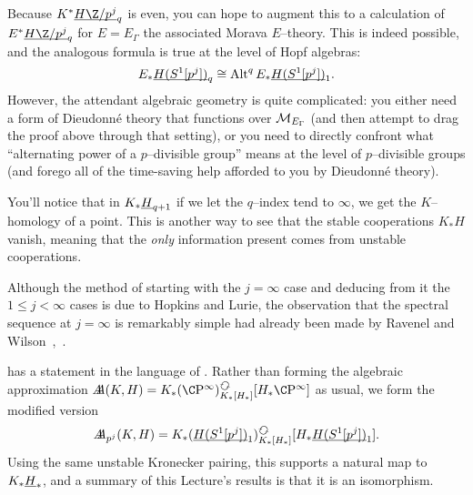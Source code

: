 \begin{remark}\label{EThyOfEMSpaces}
Because $K^* \OS{H\Z/p^j}{q}$ is even, you can hope to augment this to a calculation of $E^* \OS{H\Z/p^j}{q}$ for $E = E_\Gamma$ the associated Morava $E$--theory.  This is indeed possible, and the analogous formula is true at the level of Hopf algebras: \[E_* \underline{\smash{H(S^1[p^j])}}_{q} \cong \operatorname{Alt}^q E_* \underline{\smash{H(S^1[p^j])}}_{1}.\] However, the attendant algebraic geometry is quite complicated: you either need a form of Dieudonn\'e theory that functions over $\mathcal{M}_{E_\Gamma}$ (and then attempt to drag the proof above through that setting), or you need to directly confront what ``alternating power of a $p$--divisible group'' means at the level of $p$--divisible groups (and forego all of the time-saving help afforded to you by Dieudonn\'e theory).
\end{remark}

\begin{remark}
You'll notice that in $K_* \underline{\smash{H}}_{q+1}$ if we let the $q$--index tend to $\infty$, we get the $K$--homology of a point.  This is another way to see that the stable cooperations $K_* H$ vanish, meaning that the \emph{only} information present comes from unstable cooperations.
\end{remark}

\begin{remark}
Although the method of starting with the $j = \infty$ case and deducing from it the $1 \le j < \infty$ cases is due to Hopkins and Lurie, the observation that the spectral sequence at $j = \infty$ is remarkably simple had already been made by Ravenel and Wilson~\cite[Theorem 12.3]{RavenelWilsonKthyOfEMSpaces},~\cite[Theorem 8.1.3]{RWY}.
\end{remark}

\begin{remark}
 has a statement in the language of .  Rather than forming the algebraic approximation $\AA(K, H) = K_*(\CP^\infty)_{K_*[H_*]}^{\circulatearrows}[H_* \CP^\infty]$ as usual, we form the modified version \[\AA_{p^j}(K, H) = K_*(\OS{H(S^1[p^j])}{1})_{K_*[H_*]}^{\circulatearrows}[H_* \OS{H(S^1[p^j])}{1}].\]  Using the same unstable Kronecker pairing, this supports a natural map to $K_* \underline{\smash{H}}_{*}$, and a summary of this Lecture's results is that it is an isomorphism.
\end{remark}








